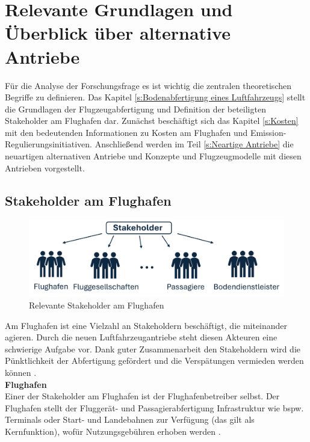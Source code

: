 \chapter{Relevante Grundlagen und Überblick über alternative Antriebe}
\label{ch:Relevante Grundlagen und Überblick über alternative Antriebe}
Für die Analyse der Forschungsfrage es ist wichtig die zentralen theoretischen Begriffe zu definieren. 
Das Kapitel \ref{s:Bodenabfertigung eines Luftfahrzeugs} stellt die Grundlagen der Flugzeugabfertigung und Definition
der beteiligten Stakeholder am Flughafen dar. Zunächst beschäftigt sich das Kapitel \ref{s:Kosten}
mit den bedeutenden Informationen zu Kosten am Flughafen und Emission-Regulierungsinitiativen. 
Anschließend werden im Teil \ref{s:Neartige Antriebe}
die neuartigen alternativen Antriebe und Konzepte und Flugzeugmodelle mit diesen Antrieben vorgestellt.

\section{Stakeholder am Flughafen}
\label{s:Stakeholder am Flughafen}
%
\begin{figure}[h]
	\centering
	\includegraphics[width=0.8\linewidth]{Bilder/Stakeholder.png}
	\caption[Relevante Stakeholder am Flughafen]{Relevante Stakeholder am Flughafen}
	\label{stakeholder}
\end{figure}

Am Flughafen ist eine Vielzahl an Stakeholdern beschäftigt, die miteinander agieren. Durch die neuen Luftfahrzeugantriebe 
steht diesen Akteuren eine schwierige Aufgabe vor. Dank guter Zusammenarbeit den Stakeholdern wird
die Pünktlichkeit der Abfertigung gefördert und die Verspätungen vermieden werden können \cite{schmidt2016challenges}.\\
%
\textbf{Flughafen} \\
Einer der Stakeholder am Flughafen ist der Flughafenbetreiber selbst. 
Der Flughafen stellt der Fluggerät- und Passagierabfertigung Infrastruktur wie bspw. Terminals oder Start- und Landebahnen zur Verfügung (das gilt als Kernfunktion), 
wofür Nutzungsgebühren erhoben werden \cite{conrady2019luftverkehr}. %

